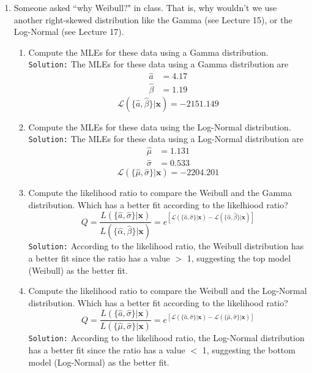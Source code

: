 \documentclass{article}\usepackage[]{graphicx}\usepackage[]{xcolor}
\begin{document}
\begin{enumerate}
  \item Someone asked ``why Weibull?" in class. That is, why wouldn't we use 
  another right-skewed distribution like the Gamma (see Lecture 15), or
  the Log-Normal (see Lecture 17).
  \begin{enumerate}
    \item Compute the MLEs for these data using a Gamma distribution.\\ 
    \texttt{Solution:} The MLEs for these data using a Gamma distribution are
    \begin{align*}
      \hat{a}&=4.17\\
      \hat{\beta}&=1.19 
    \end{align*}
    \[\mathcal{L}(\{\hat{a}, \hat{\beta}\}|\mathbf{x}) = -2151.149\]
    \item Compute the MLEs for these data using the Log-Normal distribution. \\
    \texttt{Solution:} The MLEs for these data using a Log-Normal distribution are
    \begin{align*}
      \hat{\mu}&=1.131\\
      \hat{\sigma}&=0.533 
    \end{align*}
    \[\mathcal{L}(\{\hat{\mu}, \hat{\sigma}\}|\mathbf{x}) = -2204.201\]
    \item Compute the likelihood ratio to compare the Weibull and the Gamma distribution. 
    Which has a better fit according to the likelhiood ratio?
    \[Q = \frac{L(\{\hat{a}, \hat{\sigma}\}|\mathbf{x})}{L(\{\hat{\alpha}, \hat{\beta}\}|\mathbf{x})}=e^{\left[\mathcal{L}(\{\hat{a}, \hat{\sigma}\}|\mathbf{x}) - \mathcal{L}(\{\hat{\alpha}, \hat{\beta}\}|\mathbf{x})\right]}\]
    \texttt{Solution:} According to the likelihood ratio, the Weibull distribution has a better
    fit since the ratio has a value $>$ 1, suggesting the top model (Weibull) as the better fit.
    \\
    \item Compute the likelihood ratio to compare the Weibull and the Log-Normal distribution.
    Which has a better fit according to the likelihood ratio? 
    \[Q = \frac{L(\{\hat{a}, \hat{\sigma}\}|\mathbf{x})}{L(\{\hat{\mu}, \hat{\sigma}\}|\mathbf{x})}=e^{\left[\mathcal{L}(\{\hat{a}, \hat{\sigma}\}|\mathbf{x}) - \mathcal{L}(\{\hat{\mu}, \hat{\sigma}\}|\mathbf{x})\right]}\]
    \texttt{Solution:} According to the likelihood ratio, the Log-Normal distribution has a         better fit since the ratio has a value $<$ 1, suggesting the bottom model (Log-Normal) as       the better fit.

\end{enumerate}
\end{enumerate}
\end{document}
